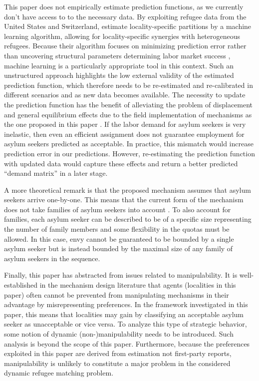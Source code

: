 \documentclass[12pt,fleqn]{article}
\begin{document}
This paper does not empirically estimate prediction functions, as we currently don't have access to to the necessary data. By exploiting refugee data from the United States and Switzerland, \cite{bib:BansakEtAl} estimate locality-specific partitions by a machine learning algorithm, allowing for locality-specific synergies with heterogeneous refugees. Because their algorithm focuses on minimizing prediction error rather than uncovering structural parameters determining labor market success \citep{bib:MullainathanSpiess}, machine learning is a particularly appropriate tool in this context. Such an unstructured approach highlights the low external validity of the estimated prediction function, which therefore needs to be re-estimated and re-calibrated in different scenarios and as new data becomes available. The necessity to update the prediction function has the benefit of alleviating the problem of displacement and general equilibrium effects due to the field implementation of mechanisms as the one proposed in this paper \citep{bib:CreponEtAl}. If the labor demand for asylum seekers is very inelastic, then even an efficient assignment does not guarantee employment for asylum seekers predicted as acceptable. In practice, this mismatch would increase prediction error in our predictions. However, re-estimating the prediction function with updated data would capture these effects and return a better predicted ``demand matrix'' in a later stage. 

A more theoretical remark is that the proposed mechanism assumes that asylum seekers arrive one-by-one. This means that the current form of the mechanism does not take families of asylum seekers into account \citep[see, e.g.,][for a mechanism that keeps families intact in house allocation problems with asylum seekers]{bib:AnderssonEhlers}. To also account for families, each asylum seeker can be described to be of a specific size representing the number of family members and some flexibility in the quotas must be allowed. In this case, envy cannot be guaranteed to be bounded by a single asylum seeker but is instead bounded by the maximal size of any family of asylum seekers in the sequence.

Finally, this paper has abstracted from issues related to manipulability. It is  well-established in the mechanism design literature that agents (localities in this paper) often cannot be prevented from manipulating mechanisms in their advantage by misrepresenting preferences. In the framework investigated in this paper, this means that localities may gain by classifying an acceptable asylum seeker as unacceptable or vice versa. To analyze this type of strategic behavior, some notion of dynamic (non-)manipulability needs to be introduced. Such analysis is beyond the scope of this paper. Furthermore, because the preferences exploited in this paper are derived from estimation not first-party reports, manipulability is unlikely to constitute a major problem in the considered dynamic refugee matching problem.
\end{document}
